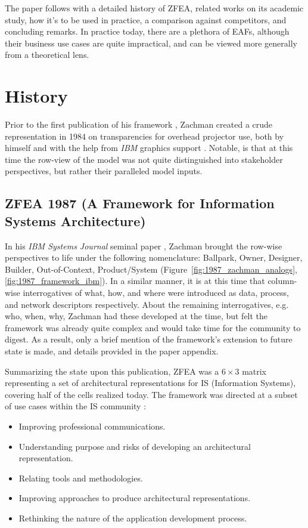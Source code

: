 \documentclass[12pt,conference]{IEEEtran}
\begin{document}
The paper follows with a detailed history of ZFEA, related works on its academic study, how it's to be used in practice, a comparison against competitors, and concluding remarks.
In practice today, there are a plethora of EAFs, although their business use cases are quite impractical, and can be viewed more generally from a theoretical lens. 

\section{History}
Prior to the first publication of his framework \cite{zachman_ibm_1987}, Zachman created a crude representation in 1984 on transparencies for overhead projector use, both by himself and with the help from \emph{IBM} graphics support \cite{Zachman_Evolution}. 
Notable, is that at this time the row-view of the model was not quite distinguished into stakeholder perspectives, but rather their paralleled model inputs.

\subsection{ZFEA 1987 (A Framework for Information Systems Architecture)}
In his \emph{IBM Systems Journal} seminal paper \cite{zachman_ibm_1987}, Zachman brought the row-wise perspectives to life under the following nomenclature: Ballpark, Owner, Designer, Builder, Out-of-Context, Product/System (Figure~\ref{fig:1987_zachman_analogs},\ref{fig:1987_framework_ibm}).
In a similar manner, it is at this time that column-wise interrogatives of what, how, and where were introduced as data, process, and network descriptors respectively.
About the remaining interrogatives, e.g. who, when, why, Zachman had these developed at the time, but felt the framework was already quite complex and would take time for the community to digest. 
As a result, only a brief mention of the framework's extension to future state is made, and details provided in the paper appendix. 

Summarizing the state upon this publication, ZFEA was a $6 \times 3$ matrix representing a set of architectural representations for IS (Information Systems), covering half of the cells realized today. 
The framework was directed at a subset of use cases within the IS community \cite{zachman_ibm_1987}: 
\begin{itemize}
    \item Improving professional communications.
    \item Understanding purpose and risks of developing an architectural representation.
    \item Relating tools and methodologies.
    \item Improving approaches to produce architectural representations.
    \item Rethinking the nature of the application development process.
\end{itemize}
\end{document}
